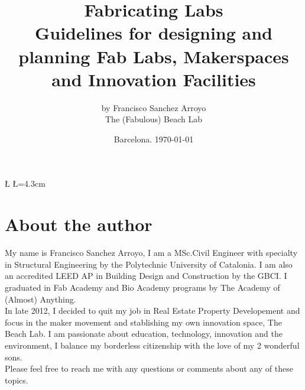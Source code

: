 \documentclass[a4paper,12pt,titlepage]{article}
\title{Fabricating Labs\\
\Huge \textbf{Guidelines for designing and planning Fab Labs, Makerspaces and Innovation Facilities}}
\author{
by Francisco Sanchez Arroyo\\
The (Fabulous) Beach Lab
}
\date{Barcelona. \today}
\begin{document}

\newcommand{\D}{6} %

\newdimen\R %
\R=3.5cm 
\newdimen\L %
\L=4.3cm



\maketitle

\tableofcontents %
\clearpage






\pagestyle{fancy}

\section*{About the author}
My name is Francisco Sanchez Arroyo, I am a MSc.Civil Engineer with specialty in Structural Engineering by the Polytechnic University of Catalonia. I am also an accredited LEED AP in Building Design and Construction by the GBCI. I graduated in Fab Academy and Bio Academy programs by The Academy of (Almost) Anything.\\ 

In late 2012, I decided to quit my job in Real Estate Property Developement and focus in the maker movement and stablishing my own innovation space, The Beach Lab. I am passionate about education, technology, innovation and the environment, I balance my borderless citizenship with the love of my 2 wonderful sons.\\

Please feel free to reach me with any questions or comments about any of these topics.\\
\end{document}
